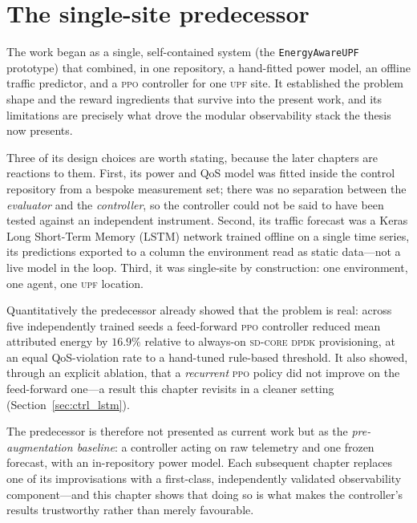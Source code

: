 \documentclass[12pt, a4paper]{report}
\newcommand{\dpdk}{\textsc{sd-core dpdk}}
\newcommand{\upf}{\textsc{upf}}
\newcommand{\code}[1]{\texttt{#1}}
\newcommand{\ppo}{\textsc{ppo}}
\begin{document}
\section{The single-site predecessor}
\label{sec:ctrl_predecessor}

The work began as a single, self-contained system (the \code{EnergyAwareUPF}
prototype) that combined, in one repository, a hand-fitted power model, an
offline traffic predictor, and a \ppo{} controller for one \upf{} site. It
established the problem shape and the reward ingredients that survive into the
present work, and its limitations are precisely what drove the modular
observability stack the thesis now presents.

Three of its design choices are worth stating, because the later chapters are
reactions to them. First, its power and QoS model was fitted inside the control
repository from a bespoke measurement set; there was no separation between the
\emph{evaluator} and the \emph{controller}, so the controller could not be said
to have been tested against an independent instrument. Second, its traffic
forecast was a Keras Long Short-Term Memory (LSTM) network trained offline on a
single time series, its predictions exported to a column the environment read as
static data---not a live model in the loop. Third, it was single-site by
construction: one environment, one agent, one \upf{} location.

Quantitatively the predecessor already showed that the problem is real: across
five independently trained seeds a feed-forward \ppo{} controller reduced mean
attributed energy by $16.9\%$ relative to always-on \dpdk{} provisioning, at an
equal QoS-violation rate to a hand-tuned rule-based threshold. It also showed,
through an explicit ablation, that a \emph{recurrent} \ppo{} policy did not
improve on the feed-forward one---a result this chapter revisits in a cleaner
setting (Section~\ref{sec:ctrl_lstm}).

The predecessor is therefore not presented as current work but as the
\emph{pre-augmentation baseline}: a controller acting on raw telemetry and one
frozen forecast, with an in-repository power model. Each subsequent chapter
replaces one of its improvisations with a first-class, independently validated
observability component---and this chapter shows that doing so is what makes the
controller's results trustworthy rather than merely favourable.

\end{document}
